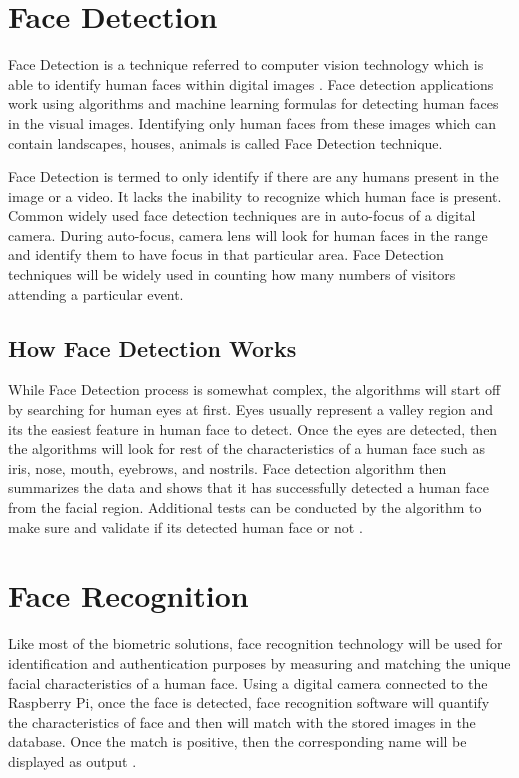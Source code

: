 \documentclass[sigconf]{acmart}
\begin{document}
\section{Face Detection}
Face Detection is a technique referred to computer vision technology which is able to identify human faces within digital images \cite{divya2013}. Face detection applications work using algorithms and machine learning formulas for detecting human faces in the visual images. Identifying only human faces from these images which can contain landscapes, houses, animals is called Face Detection technique.

Face Detection is termed to only identify if there are any humans present in the image or a video. It lacks the inability to recognize which human face is present. Common widely used face detection techniques are in auto-focus of a digital camera. During auto-focus, camera lens will look for human faces in the range and identify them to have focus in that particular area.
Face Detection techniques will be widely used in counting how many numbers of visitors attending a particular event.

\subsection{How Face Detection Works}
While Face Detection process is somewhat complex, the algorithms will start off by searching for human eyes at first. Eyes usually represent a valley region and its the easiest feature in human face to detect. Once the eyes are detected, then the algorithms will look for rest of the characteristics of a human face such as iris, nose, mouth, eyebrows, and nostrils. Face detection algorithm then summarizes the data and shows that it has successfully detected a human face from the facial region. Additional tests can be conducted by the algorithm to make sure and validate if its detected human face or not \cite{jesse2017}.

\section{Face Recognition}
Like most of the biometric solutions, face recognition technology will be used for identification and authentication purposes by measuring and matching the unique facial characteristics of a human face. Using a digital camera connected to the Raspberry Pi, once the face is detected, face recognition software will quantify the characteristics of face and then will match with the stored images in the database. Once the match is positive, then the corresponding name will be displayed as output \cite{biometrics2016}.
\end{document}
